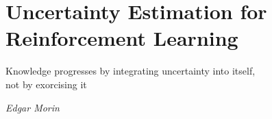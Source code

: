 \chapter{Uncertainty Estimation for Reinforcement Learning}
\label{chap:reinforcement_learning}

\epigraph{Knowledge progresses by integrating uncertainty into itself,\\ not by exorcising it}{\textit{Edgar Morin}}










